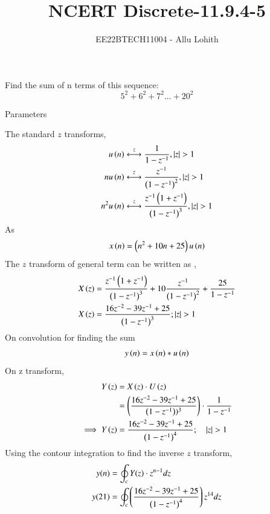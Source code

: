\documentclass[journal,12pt,twocolumn]{IEEEtran}
\theoremstyle{remark}
\begin{document}

\vspace{3cm}

\title{NCERT Discrete-11.9.4-5}
\author{EE22BTECH11004 - Allu Lohith}

\maketitle
\newpage
\bigskip


 Find the sum of n terms of this sequence:$$5^2+6^2+7^2...+20^2$$  
\solution
\begin{table}[h!]
\centering

\vspace{0.5cm}
\caption{\normalsize Parameters}
\end{table}
The standard $z$ transforms,
\begin{align}
    u \left(n\right) &\stackrel{z}{\longleftrightarrow} \frac{1}{1-z^{-1}}, \left\vert z\right\vert >1\\
   n u\left(n\right) &\stackrel{z}{\longleftrightarrow} \frac{z^{-1}}{\left(1-z^{-1}\right)^2}, \left\vert z\right\vert >1\\
   n^2 u\left(n\right) &\stackrel{z}{\longleftrightarrow} \frac{z^{-1}\left(1+z^{-1}\right)}{\left(1-z^{-1}\right)^3}, \left\vert z\right\vert >1
\end{align}
As 
\begin{align}
    x\left(n\right) = \left(n^2+10n+25\right)u\left(n\right)
\end{align}
The $z$ transform of general term can be written as , 
\begin{align}
    X\left(z\right) &= \frac{z^{-1}\left(1+z^{-1}\right)}{\left(1-z^{-1}\right)^3}+10\frac{z^{-1}}{\left(1-z^{-1}\right)^2}+\frac{25}{1-z^{-1}} \\
    X\left(z\right) &=  \frac{16z^{-2}-39z^{-1}+25}{\left(1-z^{-1}\right)^3}; \left\vert z\right\vert>1
\end{align}
On convolution for finding the sum
\begin{align}
    y\left(n\right)= x\left(n\right) \ast u\left(n\right)
\end{align}
On z transform,
\begin{align}
    Y\left(z\right) &= X \left(z\right) \cdot U \left(z\right)\\
    &= \left(\frac{16z^{-2}-39z^{-1}+25}{\left(1-z^{-1}\right))^3}\right) \cdot \frac{1}{1-z^{-1}}\\
    \implies 
    Y \left(z\right) & = \frac{16z^{-2}-39z^{-1}+25}{\left(1-z^{-1}\right)^4}; \quad \left\vert z\right\vert >1
\end{align}
Using the contour integration to find the inverse $z$ transform,
\begin{align}
    y(n)&=\oint_c Y(z)\cdot z^{n-1}dz\\
    y(21)&=\oint_c \left(\frac{16z^{-2}-39z^{-1}+25}{\left(1-z^{-1}\right)^4}\right) z^{14}dz
\end{align}
\end{document}
